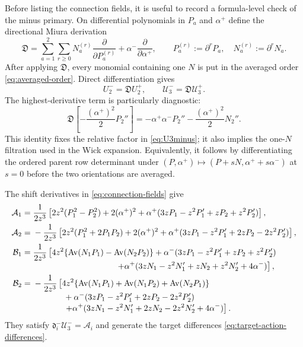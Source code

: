 \documentclass[11pt,a4paper]{article}
\numberwithin{equation}{section}
\theoremstyle{remark}
\newcommand{\Av}[1]{\operatorname{Av}\!\left(#1\right)}
\newcommand{\cU}{\mathcal U}
\newcommand{\cA}{\mathcal A}
\newcommand{\cB}{\mathcal B}
\begin{document}
Before listing the connection fields, it is useful to record a formula-level check of the
minus primary.  On differential polynomials in $P_a$ and $\alpha^+$ define the directional
Miura derivation
\begin{equation}
 \mathfrak D=
 \sum_{a=1}^{2}\sum_{r\ge0}N_a^{(r)}
 \frac{\partial}{\partial P_a^{(r)}}
 +\alpha^-\frac{\partial}{\partial\alpha^+},
 \qquad P_a^{(r)}:=\partial^rP_a,\quad N_a^{(r)}:=\partial^rN_a.
 \label{eq:directional-miura-derivation}
\end{equation}
After applying $\mathfrak D$, every monomial containing one $N$ is put in the averaged order
\cref{eq:averaged-order}.  Direct differentiation gives
\begin{equation}
 U_2^-=\mathfrak D U_2^+,\qquad
 \cU_3^-=\mathfrak D\cU_3^+.
 \label{eq:directional-miura-audit}
\end{equation}
The highest-derivative term is particularly diagnostic:
\begin{equation}
 \mathfrak D\left[-\frac{(\alpha^+)^2}{2}P_2''\right]
 =-\alpha^+\alpha^-P_2''-\frac{(\alpha^+)^2}{2}N_2''.
 \label{eq:highest-derivative-audit}
\end{equation}
This identity fixes the relative factor in \cref{eq:U3minus}; it also implies the one-$N$
filtration used in the Wick expansion.  Equivalently, it follows by differentiating the ordered
parent row determinant under
$(P,\alpha^+)\mapsto(P+sN,\alpha^++s\alpha^-)$ at $s=0$ before the two orientations are
averaged.

The shift derivatives in \cref{eq:connection-fields} give
\begin{align}
 \cA_1={}&\frac{1}{2z^3}\left[
 2z^2(P_1^2-P_2^2)+2(\alpha^+)^2
 +\alpha^+(3zP_1-z^2P_1'+zP_2+z^2P_2')\right],
 \label{eq:A1-field}\\
 \cA_2={}&-\frac{1}{2z^3}\left[
 2z^2(P_1^2+2P_1P_2)+2(\alpha^+)^2
 +\alpha^+(3zP_1-z^2P_1'+2zP_2-2z^2P_2')\right],
 \label{eq:A2-field}\\
 \cB_1={}&\frac{1}{2z^3}\left[
 4z^2\{\Av{N_1P_1}-\Av{N_2P_2}\}
 +\alpha^-(3zP_1-z^2P_1'+zP_2+z^2P_2')
 \right.\nonumber\\[-1mm]
 &\hspace{35mm}\left.
 +\alpha^+(3zN_1-z^2N_1'+zN_2+z^2N_2'+4\alpha^-)
 \right],
 \label{eq:B1-field}\\
 \cB_2={}&-\frac{1}{2z^3}\left[
 4z^2\{\Av{N_1P_1}+\Av{N_1P_2}+\Av{N_2P_1}\}
 \right.\nonumber\\[-1mm]
 &\hspace{13mm}+\alpha^-(3zP_1-z^2P_1'+2zP_2-2z^2P_2')
 \nonumber\\[-1mm]
 &\hspace{13mm}\left.
 +\alpha^+(3zN_1-z^2N_1'+2zN_2-2z^2N_2'+4\alpha^-)
 \right].
 \label{eq:B2-field}
\end{align}
They satisfy $\mathfrak d_i^-\cU_3^-=\cA_i$ and generate the target differences
\cref{eq:target-action-differences}.
\end{document}
